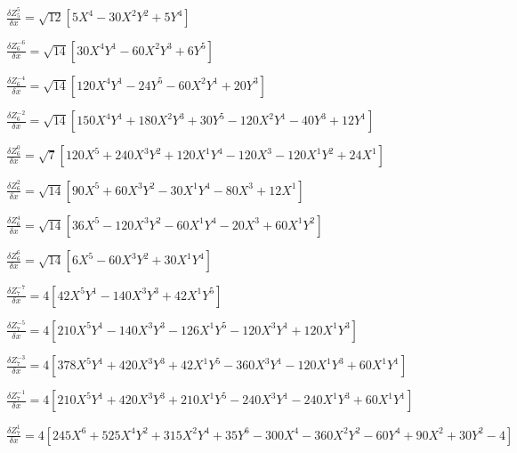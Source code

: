 \documentclass[10pt,landscape]{article}
\begin{document}
\vspace{1.2 mm}
\noindent $ \frac{\delta Z^{5}_{5}}{\delta x} = \sqrt{12} [5X^{4} -30X^{2}Y^{2} +5Y^{4}] $

\vspace{1.2 mm}
\noindent $ \frac{\delta Z^{-6}_{6}}{\delta x} = \sqrt{14} [30X^{4}Y^{1} -60X^{2}Y^{3} +6Y^{5}] $

\vspace{1.2 mm}
\noindent $ \frac{\delta Z^{-4}_{6}}{\delta x} = \sqrt{14} [120X^{4}Y^{1} -24Y^{5} -60X^{2}Y^{1} +20Y^{3}] $

\vspace{1.2 mm}
\noindent $ \frac{\delta Z^{-2}_{6}}{\delta x} = \sqrt{14} [150X^{4}Y^{1} +180X^{2}Y^{3} +30Y^{5} -120X^{2}Y^{1} -40Y^{3} +12Y^{1}] $

\vspace{1.2 mm}
\noindent $ \frac{\delta Z^{0}_{6}}{\delta x} = \sqrt{7} [120X^{5} +240X^{3}Y^{2} +120X^{1}Y^{4} -120X^{3} -120X^{1}Y^{2} +24X^{1}] $

\vspace{1.2 mm}
\noindent $ \frac{\delta Z^{2}_{6}}{\delta x} = \sqrt{14} [90X^{5} +60X^{3}Y^{2} -30X^{1}Y^{4} -80X^{3} +12X^{1}] $

\vspace{1.2 mm}
\noindent $ \frac{\delta Z^{4}_{6}}{\delta x} = \sqrt{14} [36X^{5} -120X^{3}Y^{2} -60X^{1}Y^{4} -20X^{3} +60X^{1}Y^{2}] $

\vspace{1.2 mm}
\noindent $ \frac{\delta Z^{6}_{6}}{\delta x} = \sqrt{14} [6X^{5} -60X^{3}Y^{2} +30X^{1}Y^{4}] $

\vspace{1.2 mm}
\noindent $ \frac{\delta Z^{-7}_{7}}{\delta x} = 4 [42X^{5}Y^{1} -140X^{3}Y^{3} +42X^{1}Y^{5}] $

\vspace{1.2 mm}
\noindent $ \frac{\delta Z^{-5}_{7}}{\delta x} = 4 [210X^{5}Y^{1} -140X^{3}Y^{3} -126X^{1}Y^{5} -120X^{3}Y^{1} +120X^{1}Y^{3}] $

\vspace{1.2 mm}
\noindent $ \frac{\delta Z^{-3}_{7}}{\delta x} = 4 [378X^{5}Y^{1} +420X^{3}Y^{3} +42X^{1}Y^{5} -360X^{3}Y^{1} -120X^{1}Y^{3} +60X^{1}Y^{1}] $

\vspace{1.2 mm}
\noindent $ \frac{\delta Z^{-1}_{7}}{\delta x} = 4 [210X^{5}Y^{1} +420X^{3}Y^{3} +210X^{1}Y^{5} -240X^{3}Y^{1} -240X^{1}Y^{3} +60X^{1}Y^{1}] $

\vspace{1.2 mm}
\noindent $ \frac{\delta Z^{1}_{7}}{\delta x} = 4 [245X^{6} +525X^{4}Y^{2} +315X^{2}Y^{4} +35Y^{6} -300X^{4} -360X^{2}Y^{2} -60Y^{4} +90X^{2} +30Y^{2} -4] $
\end{document}
